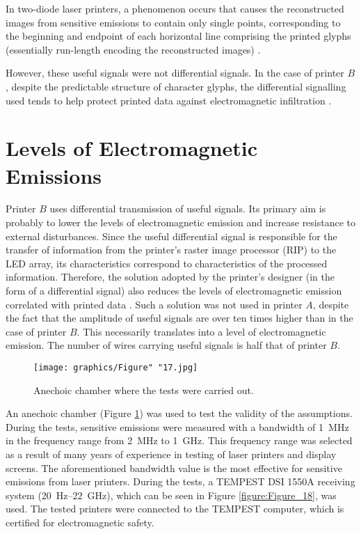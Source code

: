 \documentclass[12pt,a4paper]{article}
\begin{document}
In two-diode laser printers, a phenomenon occurs that causes the
reconstructed images from sensitive emissions to contain only single points,
corresponding to the beginning and endpoint of each horizontal line
comprising the printed glyphs (essentially run-length encoding
the reconstructed images) \cite{Kubiak2014d}.

However, these useful signals were not differential signals. In the case of
printer $B$, despite the predictable structure of character glyphs, the
differential signalling used tends to help protect printed data against
electromagnetic infiltration \cite{Ketenci2017a}.

\section{Levels of Electromagnetic Emissions}

Printer $B$ uses differential transmission of useful signals. Its primary aim
is probably to lower the levels of electromagnetic emission and increase
resistance to external disturbances. Since the useful differential signal is
responsible for the transfer of information from the printer's raster image
processor (RIP) to the LED array, its characteristics correspond to
characteristics of the processed information. Therefore, the solution adopted
by the printer's designer (in the form of a differential signal) also reduces
the levels of electromagnetic emission correlated with printed data
\cite{Song2015a}. Such a solution was not used in printer $A$, despite the
fact that the amplitude of useful signals are over ten times higher than in
the case of printer $B$. This necessarily translates into a level of
electromagnetic emission. The number of wires carrying useful signals is half
that of printer $B$.

\begin{figure}[ht]
    \centering
    \texttt{[image: graphics/Figure" "17.jpg]}
    \caption{Anechoic chamber where the tests were carried out.}
    \label{figure:Figure_17}
\end{figure}

An anechoic chamber (Figure \ref{figure:Figure_17}) was used to test the
validity of the assumptions.
During the tests, sensitive emissions were measured with a bandwidth of
\SI{1}{\mega\hertz} in the frequency range from \SI{2}{\mega\hertz} to
\SI{1}{\giga\hertz}. This frequency range was selected as a result of many
years of experience in testing of laser printers and display screens. The
aforementioned bandwidth value is the most effective for sensitive emissions
from laser printers. During the tests, a TEMPEST DSI 1550A receiving system
(\SI{20}{\hertz}--\SI{22}{\giga\hertz}), which can be seen in Figure
\ref{figure:Figure_18}, was used. The tested printers were connected to the
TEMPEST computer, which is certified for electromagnetic safety.
\end{document}
